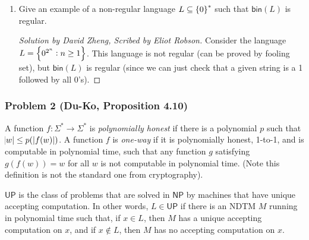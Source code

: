 \documentclass{article}
\newenvironment{scribed}[2]{\begin{proof}[Solution by #1, Scribed by #2]}{\end{proof}}
\newcommand{\NP}{\mathsf{NP}}
\newcommand{\UP}{\mathsf{UP}}
\newcommand{\bin}{\mathsf{bin}}
\begin{document}
\begin{enumerate}
    \item Give an example of a non-regular language \(L \subseteq \set{0}^*\) such that \(\bin(L)\) is regular.
    
    \begin{scribed}{David Zheng}{Eliot Robson}
    	Consider the language \(L = \set{0^{2^n} : n \geq 1}\). This language is not regular (can be proved by fooling set), but \(\bin(L)\) is regular (since we can just check that a given string is a 1 followed by all 0's).
    \end{scribed}
\end{enumerate}

\subsubsection{Problem 2 (Du-Ko, Proposition 4.10)}
A function \(f : \Sigma^* \to \Sigma^*\) is \emph{polynomially honest} if there is a polynomial \(p\) such that \(\abs{w} \leq p(\abs[0]{f(w)})\). A function \(f\) is \textit{one-way} if it is polynomially honest, 1-to-1, and is computable in polynomial time, such that any function \(g\) satisfying \(g(f(w)) = w\) for all \(w\) is not computable in polynomial time. (Note this definition is not the standard one from cryptography).

\(\UP\) is the class of problems that are solved in \(\NP\) by machines that have unique accepting computation. In other words, \(L \in \UP\) if there is an NDTM \(M\) running in polynomial time such that, if \(x \in L\), then \(M\) has a unique accepting computation on \(x\), and if \(x \notin L\), then \(M\) has no accepting computation on \(x\).
\end{document}
